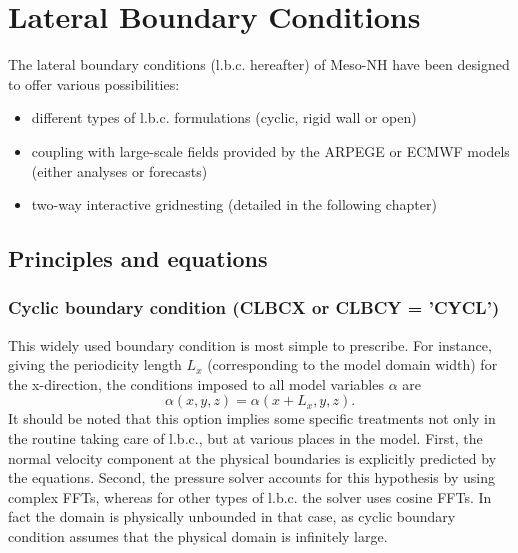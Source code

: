 
\chapter{Lateral Boundary Conditions}
\minitoc


The lateral boundary conditions (l.b.c. hereafter) of Meso-NH
have been designed to offer various possibilities:

\begin{itemize}
\item different types of l.b.c. formulations (cyclic, rigid wall or open)
\item coupling with large-scale fields provided by the ARPEGE or ECMWF models
 (either analyses or forecasts)
\item two-way interactive gridnesting (detailed in the following chapter)
\end{itemize}

\section{Principles and equations}

\subsection{Cyclic boundary condition (CLBCX or CLBCY = 'CYCL')}

This widely used boundary condition is most simple to prescribe. For instance,
giving the periodicity length $L_x$ (corresponding to the
model domain width) for the x-direction, the conditions imposed to all
model variables $\alpha $ are
\begin{equation}
\alpha (x,y,z) = \alpha (x+L_x,y,z) \label{perlbc}.
\end{equation}
It should be noted that this option implies some specific treatments not only
in the routine taking care of l.b.c., but at various places in the model.
First, the normal velocity component at the physical boundaries is explicitly
predicted by the equations.
Second, the pressure solver accounts for this hypothesis by using complex
FFTs, whereas for other types of l.b.c. the solver uses cosine FFTs.
 In fact the domain is physically unbounded in that case, as cyclic
boundary condition assumes that the physical domain is infinitely large.

